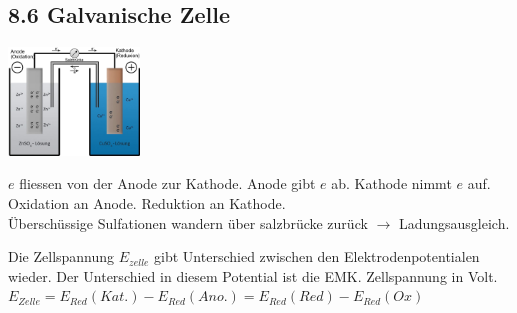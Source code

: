 \begin{multicols*}{4}
\subsection{8.6 Galvanische Zelle}{
\begin{minipage} {35mm}
    \includegraphics[width=35mm]{Bilder/GalvanischeZelle.png}
\end{minipage}
\begin{minipage}{33mm}
    $e$ fliessen von der Anode zur Kathode. Anode gibt $e$ ab. Kathode nimmt $e$ auf.
    Oxidation an Anode. Reduktion an Kathode.\\ 
    Überschüssige Sulfationen wandern über salzbrücke zurück $\rightarrow$ Ladungsausgleich.
\end{minipage}


\vspace{1mm}Die Zellspannung $E_{zelle}$ gibt Unterschied zwischen den Elektrodenpotentialen wieder. Der Unterschied in diesem Potential ist die EMK. Zellspannung in  Volt.
$E_{Zelle}=E_{Red}(Kat.)-E_{Red}(Ano.)=E_{Red}(Red)-E_{Red}(Ox)$
}
\mbox{}
\end{multicols*} 
